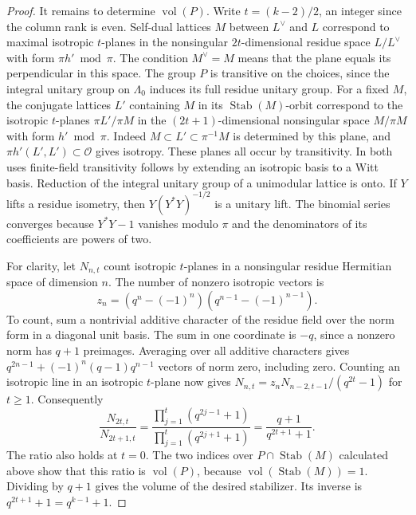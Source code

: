 \documentclass[a4paper,11pt]{article}
\theoremstyle{definition}
\theoremstyle{remark}
\numberwithin{equation}{section}
\begin{document}
\begin{proof}
It remains to determine \(\operatorname{vol}(P)\). Write
\(t=(k-2)/2\), an integer since the column rank is even.
Self-dual lattices \(M\) between \(L^\vee\) and \(L\) correspond
to maximal isotropic \(t\)-planes in the nonsingular
\(2t\)-dimensional residue space \(L/L^\vee\) with form
\(\pi h'\bmod\pi\). The condition \(M^\vee=M\) means that the
plane equals its perpendicular in this space. The group \(P\)
is transitive on the choices, since the integral unitary group
on \(\Lambda_0\) induces its full residue unitary group. For a
fixed \(M\), the conjugate lattices \(L'\) containing \(M\)
in its \(\operatorname{Stab}(M)\)-orbit correspond to the isotropic
\(t\)-planes \(\pi L'/\pi M\) in the \((2t+1)\)-dimensional
nonsingular space \(M/\pi M\) with form \(h'\bmod\pi\).
Indeed \(M\subset L'\subset\pi^{-1}M\) is determined by this
plane, and \(\pi h'(L',L')\subset\mathcal O\) gives isotropy.
These planes all occur by transitivity. In both uses finite-field
transitivity follows by extending an isotropic basis to a Witt
basis. Reduction of the integral unitary group of a unimodular
lattice is onto. If \(Y\) lifts a residue isometry, then
\(Y(Y^*Y)^{-1/2}\) is a unitary lift. The binomial series
converges because \(Y^*Y-1\) vanishes modulo \(\pi\) and the
denominators of its coefficients are powers of two.

For clarity, let \(N_{n,t}\) count isotropic \(t\)-planes in a
nonsingular residue Hermitian space of dimension \(n\). The
number of nonzero isotropic vectors is
\[
            z_n=(q^n-(-1)^n)(q^{n-1}-(-1)^{n-1}).
\]
To count, sum a nontrivial additive character of the residue
field over the norm form in a diagonal unit basis. The sum in
one coordinate is \(-q\), since a nonzero norm has \(q+1\)
preimages. Averaging over all additive characters gives
\(q^{2n-1}+(-1)^n(q-1)q^{n-1}\) vectors of norm zero,
including zero. Counting an isotropic line in an isotropic
\(t\)-plane now gives
\(N_{n,t}=z_n N_{n-2,t-1}/(q^{2t}-1)\) for \(t\ge1\).
Consequently
\[
 \frac{N_{2t,t}}{N_{2t+1,t}}=
 \frac{\prod_{j=1}^t(q^{2j-1}+1)}
      {\prod_{j=1}^t(q^{2j+1}+1)}
 =\frac{q+1}{q^{2t+1}+1}.
\]
The ratio also holds at \(t=0\). The two indices over
\(P\cap\operatorname{Stab}(M)\) calculated above show that
this ratio is \(\operatorname{vol}(P)\), because
\(\operatorname{vol}(\operatorname{Stab}(M))=1\).
Dividing by \(q+1\) gives the volume of the desired stabilizer.
Its inverse is \(q^{2t+1}+1=q^{k-1}+1\).
\end{proof}
\end{document}
